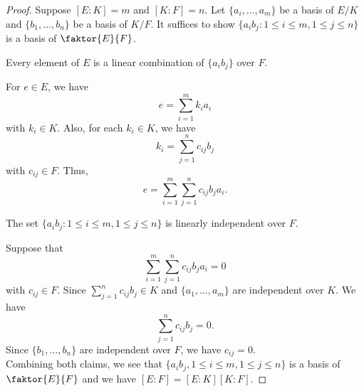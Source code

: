 \documentclass[11pt]{article}
\newcommand{\quotient}[2]{\faktor{#1}{#2}}
\begin{document}
\begin{proof}
Suppose $[E:K]=m$ and $[K:F] = n$. Let $\{a_i,\dots,a_m\}$ be a basis of
$E/K$ and $\{b_1, \dots, b_n\}$ be a basis of $K/F$. It suffices to show
$\{a_ib_j:1 \leq i \leq m, 1 \leq j \leq n\}$ is a basis of $\quotient{E}{F}$.\\

\begin{claim}
Every element of $E$ is a linear combination of $\{a_ib_j\}$ over $F$.
\end{claim}

For $e \in E$, we have
\begin{equation*}
e = \sum^m_{i=1} k_ia_i 
\end{equation*}
with $k_i \in K$. Also, for each $k_i \in K$, we have
\begin{equation*}
k_i = \sum^n_{j=1} c_{ij}b_j 
\end{equation*}
with $c_{ij} \in F$. Thus,
\begin{equation*}
e = \sum^m_{i=1} \sum^n_{j=1} c_{ij}b_ja_i.
\end{equation*}

\begin{claim}
The set $\{a_ib_j:1\leq i\leq m,1\leq j\leq n\}$ is linearly independent
over $F$.
\end{claim}
Suppose that $$\sum_{i=1}^m\sum_{j=1}^nc_{ij}b_ja_i=0$$ with $c_{ij}\in F$. Since
$\sum_{j=1}^nc_{ij}b_j\in K$ and $\{a_1,\dots,a_m\}$ are independent over $K$.
We have $$\sum_{j=1}^nc_{ij}b_j=0.$$
Since $\{b_1,\dots,b_n\}$ are independent over $F$, we have $c_{ij}=0$.\\

Combining both claims, we see that $\{a_ib_j,1\leq i\leq m,1\leq j\leq n\}$ is a
basis of $\quotient{E}{F}$ and we have $[E:F]=[E:K][K:F]$.
\end{proof}
\end{document}
